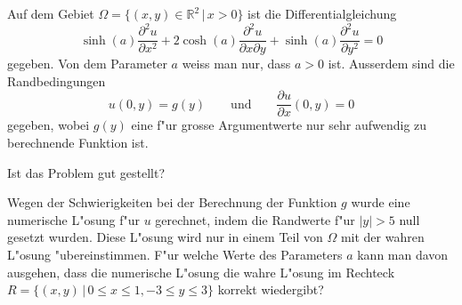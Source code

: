 Auf dem Gebiet $\Omega=\{(x,y)\in\mathbb R^2\,|\, x>0\}$ ist die
Differentialgleichung
\begin{equation}
\sinh(a)\frac{\partial^2 u}{\partial x^2}
+
2\cosh(a)\frac{\partial^2 u}{\partial x\partial y}
+
\sinh(a)\frac{\partial^2 u}{\partial y^2}
=
0
\label{90000013:dgl}
\end{equation}
gegeben.
Von dem Parameter $a$ weiss man nur, dass $a>0$ ist.
Ausserdem sind die Randbedingungen
\[
u(0,y)=g(y)\qquad\text{und}\qquad \frac{\partial u}{\partial x}(0,y)=0
\]
gegeben, wobei $g(y)$ eine f"ur grosse Argumentwerte nur sehr aufwendig zu
berechnende Funktion ist.
\begin{teilaufgaben}
\item
Ist das Problem gut gestellt?
\item
Wegen der Schwierigkeiten bei der Berechnung der Funktion $g$
wurde eine numerische L"osung f"ur $u$ gerechnet, indem die
Randwerte f"ur $|y|>5$ null gesetzt wurden.
Diese L"osung wird nur in einem Teil von $\Omega$ mit der wahren L"osung
"ubereinstimmen.
F"ur welche Werte des Parameters $a$ kann man davon ausgehen, dass die
numerische L"osung die wahre L"osung im Rechteck
$R=\{(x,y)\,|\, 0\le x\le 1,-3\le y\le 3\}$ korrekt
wiedergibt?
\end{teilaufgaben}


